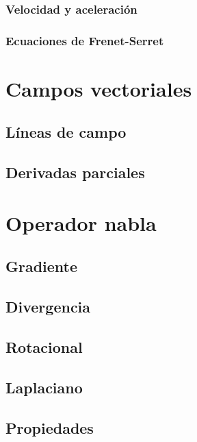 \documentclass[12pt, fleqn]{report}                             %
\theoremstyle{break}                                            %
\begin{document}
                \subsubsection{Velocidad y aceleración}
                
                \subsubsection{Ecuaciones de Frenet-Serret}
            
        \section{Campos vectoriales}
        
            \subsection{Líneas de campo}
            
            \subsection{Derivadas parciales}
        
        \section{Operador nabla}
        
            \subsection{Gradiente}
            
            \subsection{Divergencia}
            
            \subsection{Rotacional}
            
            \subsection{Laplaciano}
            
            \subsection{Propiedades}
\end{document}

